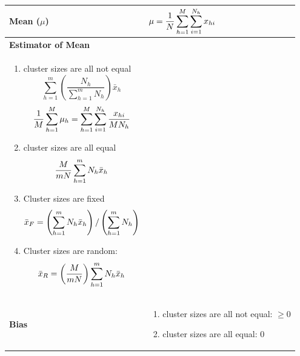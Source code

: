 \begin{longtable}{|p{5cm}|p{9cm}|}
    \hline\endfirsthead
    \hline\endhead
    \hline\endfoot
    \hline\endlastfoot

    \textbf{Mean ($\mu$)} & $
        \mu = \dfrac{1}{N}
        \displaystyle\sum_{h=1}^{M}
        \displaystyle\sum_{i=1}^{N_h}
        x_{hi}
    $\\[1ex]
    \hline

    \textbf{Estimator of Mean} & \begin{minipage}{8cm}
        \vspace{0.1cm}
        $
            \bar{x}_h = \mu_h
            \quad\quad
            \bar{x} = \dfrac{1}{m}
            \dsum_{h=1}^{m} \bar{x}_h
        $\\
        \begin{enumerate}
            \item cluster sizes are all not equal
            \[
                \displaystyle
                \sum_{h=1}^{m}
                \left(
                    \frac{N_h}{
                        \sum_{h=1}^{m} N_h
                    }
                \right)\bar{x}_h
            \]
            \[
                \dfrac{1}{M}\displaystyle\sum_{h=1}^{M}\mu_h
                =
                \displaystyle\sum_{h=1}^{M}
                \displaystyle\sum_{i=1}^{N_h}
                \dfrac{x_{hi}}{MN_h}
            \]

            \item cluster sizes are all equal
            \[
                \dfrac{M}{mN}
                \displaystyle\sum_{h=1}^{m} N_h\bar{x}_h
            \]

            \item Cluster sizes are fixed
            \[
                \bar{x}_F =
                \left( 
                    \displaystyle\sum_{h=1}^{m} N_h\bar{x}_h
                \right) / \left( 
                    \displaystyle\sum_{h=1}^{m} N_h
                \right)
            \]

            \item Cluster sizes are random:
            \[
                \bar{x}_R= \left( \dfrac{M}{mN} \right)
                \displaystyle\sum_{h=1}^{m} N_h\bar{x}_h
            \]
        \end{enumerate}
        \vspace{0.01cm}
    \end{minipage}
    \\[1ex]
    \hline

    \textbf{Bias} & \begin{minipage}{8cm}
        \begin{enumerate}
            \item cluster sizes are all not equal: $\geq 0$
            \item cluster sizes are all equal: $0$
        \end{enumerate}
        \vspace{0.1cm}
    \end{minipage}\\
    \hline


\end{longtable}
